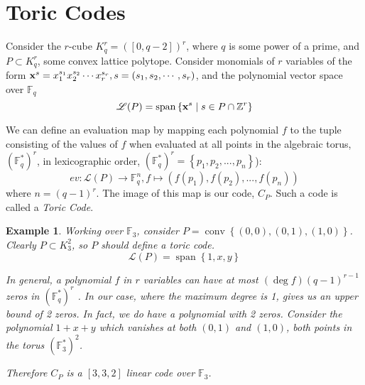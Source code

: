 \documentclass[12pt]{amsart}
\theoremstyle{plain}
\newtheorem{example}[Th]{Example}
\newcommand{\F}{\mathbb{F}}
\newcommand{\AT}{\mathbb{F}^*}
\newcommand{\Int}{\mathbb{Z}}
\DeclareMathOperator{\Span}{span}
\DeclareMathOperator{\Convex}{conv}
\begin{document}
\section{Toric Codes}
Consider the $r$-cube $K_q^r = ([0,q-2])^r$, where $q$ is some power of a prime, and $P \subset K_q^r$, some convex lattice polytope. Consider monomials of $r$ variables of the form $\bold{x}^s = x_1^{s_1} x_2^{s_2} \cdots x_r^{s_r}, s = \left(s_1,s_2,\cdots,s_r\right)$, and the polynomial vector space over $\F_q$\begin{equation*}
\mathscr{L}(P) = \Span \left\{\bold{x}^s \mid s \in P \cap \Int^r \right\}
\end{equation*}

We can define an evaluation map by mapping each polynomial $f$ to the tuple consisting of the values of $f$ when evaluated at all points in the algebraic torus, $(\F_q^*)^r$, in lexicographic order, $(\F_q^*)^r = \left\{p_1,p_2,...,p_n\right\}$):
\begin{equation*}
ev: \mathscr{L}(P) \to \F_q^n, f \mapsto \left(f(p_1),f(p_2),...,f(p_n)\right)
\end{equation*}
where $n=(q-1)^r$. The image of this map is our code, $C_P$. Such a code is called a \emph{Toric Code}.

\begin{example}
Working over $\F_3$, consider $P = \Convex \left\{(0,0),(0,1),(1,0)\right\}$. Clearly $P \subset K_3^2$, so $P$ should define a toric code.
\begin{equation*}
\mathscr{L}(P)=\Span \left\{1,x,y \right\}
\end{equation*}

In general, a polynomial $f$ in $r$ variables can have at most $(\deg f)(q-1)^{r-1}$ zeros in $(\F_q^*)^r$ \cite{serre}. In our case, where the maximum degree is 1, gives us an upper bound of 2 zeros. In fact, we do have a polynomial with 2 zeros. Consider the polynomial $1+x+y$ which vanishes at both $(0,1)$ and $(1,0)$, both points in the torus $(\AT_3)^2$.

Therefore $C_P$ is a $\left[3,3,2\right]$ linear code over $\F_3$.

\end{example}
\end{document}
